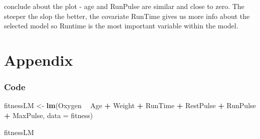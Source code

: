 \documentclass[]{article}
\newenvironment{Shaded}{\begin{snugshade}}{\end{snugshade}}
\newcommand{\KeywordTok}[1]{\textcolor[rgb]{0.13,0.29,0.53}{\textbf{#1}}}
\newcommand{\DataTypeTok}[1]{\textcolor[rgb]{0.13,0.29,0.53}{#1}}
\newcommand{\StringTok}[1]{\textcolor[rgb]{0.31,0.60,0.02}{#1}}
\newcommand{\OperatorTok}[1]{\textcolor[rgb]{0.81,0.36,0.00}{\textbf{#1}}}
\newcommand{\NormalTok}[1]{#1}
\begin{document}
conclude about the plot - age and RunPulse are similar and close to
zero. The steeper the slop the better, the covariate RunTime gives us
more info about the selected model so Runtime is the most important
variable within the model.

\section{Appendix}\label{appendix}

\subsubsection{Code}\label{code}

\begin{Shaded}
\begin{Highlighting}[]
\NormalTok{fitnessLM <-}\StringTok{ }\KeywordTok{lm}\NormalTok{(Oxygen }\OperatorTok{~}\StringTok{ }\NormalTok{Age }\OperatorTok{+}\StringTok{ }\NormalTok{Weight }\OperatorTok{+}\StringTok{ }\NormalTok{RunTime }\OperatorTok{+}\StringTok{ }\NormalTok{RestPulse }\OperatorTok{+}\StringTok{ }\NormalTok{RunPulse }\OperatorTok{+}\StringTok{ }\NormalTok{MaxPulse, }
                \DataTypeTok{data =}\NormalTok{ fitness)}

\NormalTok{fitnessLM}
\end{Highlighting}
\end{Shaded}
\end{document}

